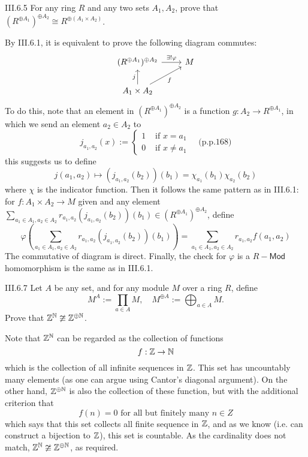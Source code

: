 \begin{problem}{III.6.5}
For any ring $R$ and any two sets $A_1, A_2$, prove that $(R^{\oplus A_1})^{\oplus A_2} \cong R^{\oplus(A_1 \times A_2)}$.
\end{problem}
\begin{pf}
By III.6.1, it is equivalent to prove the following diagram commutes:
\[
\begin{tikzcd}
(R^{\oplus A_1})^{\oplus A_2} \arrow[r, "\exists!\varphi"] & M \\
A_1 \times A_2 \arrow[ru, "f"'] \arrow[u, "j"]             &  
\end{tikzcd}
\]
To do this, note that an element in $(R^{\oplus A_1})^{\oplus A_2}$ is a function $g : A_2 \to R^{\oplus A_1}$, in which we send an element $a_2 \in A_2$ to 
\[
j_{a_1, a_2}(x) := \begin{cases}
1 &\text{ if } x = a_1 \\
0 &\text{ if } x \neq a_1 
\end{cases}	\quad \text{(p.p.168)}
\]
this suggests us to define
\[
j(a_1,a_2) \mapsto (j_{a_1,a_2}(b_2))(b_1) = \chi_{a_1}(b_1)\chi_{a_2}(b_2)	
\]
where $\chi$ is the indicator function. Then it follows the same pattern as in III.6.1: for $f : A_1 \times A_2 \to M$ given and any element $\sum_{a_1 \in A_1, a_2 \in A_2} r_{a_1,a_2} (j_{a_1,a_2}(b_2))(b_1) \in (R^{\oplus A_1})^{\oplus A_2}$, define
\[
\varphi \left(\sum_{a_1 \in A_1, a_2 \in A_2} r_{a_1,a_2} (j_{a_1,a_2}(b_2))(b_1)\right) = \sum_{a_1 \in A_1, a_2 \in A_2} r_{a_1,a_2} f(a_1,a_2)
\]
The commutative of diagram is direct. Finally, the check for $\varphi$ is a $R-\mathsf{Mod}$ homomorphism is the same as in III.6.1.
\end{pf}

\begin{problem}{III.6.7}
Let $A$ be any set, and for any module $M$ over a ring $R$, define 
\[
M^A	:= \prod_{a \in A}M, \quad M^{\oplus A} := \bigoplus_{a \in A}M.
\]
Prove that $\mathbb{Z}^{\mathbb{N}} \ncong \mathbb{Z}^{\oplus \mathbb{N}}$.
\end{problem}
\begin{pf}
Note that $\mathbb{Z}^{\mathbb{N}}$ can be regarded as the collection of functions
\[
f: \mathbb{Z} \to \mathbb{N} 
\]
which is the collection of all infinite sequences in $\mathbb{Z}$. This set has uncountably many elements (as one can argue using Cantor's diagonal argument). On the other hand, $\mathbb{Z}^{\oplus \mathbb{N}}$ is also the collection of these function, but with the additional criterion that
\[
f(n) = 0 \text{ for all but finitely many }	n \in Z
\]
which says that this set collects all finite sequence in $\mathbb{Z}$, and as we know (i.e. can construct a bijection to $\mathbb{Z}$), this set is countable. As the cardinality does not match, $\mathbb{Z}^{\mathbb{N}} \ncong \mathbb{Z}^{\oplus \mathbb{N}}$, as required.
\end{pf}

